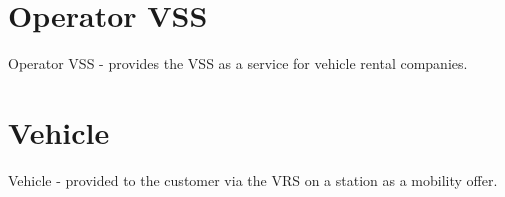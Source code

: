 \section*{Operator VSS}
Operator VSS - provides the VSS as a service for vehicle rental companies.

%
%
%
\section*{Vehicle}

Vehicle - provided to the customer via the VRS on a station as a mobility offer.

